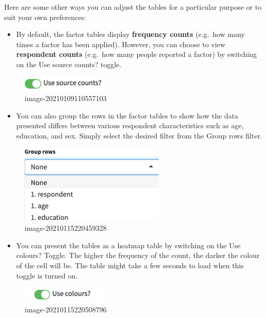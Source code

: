 \documentclass[
]{book}
\providecommand{\tightlist}{%
  \setlength{\itemsep}{0pt}\setlength{\parskip}{0pt}}
\begin{document}
Here are some other ways you can adjust the tables for a particular purpose or to suit your own preferences:

\begin{itemize}
\tightlist
\item
  By default, the factor tables display \textbf{frequency counts} (e.g.~how many times a factor has been applied). However, you can choose to view \textbf{respondent counts} (e.g.~how many people reported a factor) by switching on the Use source counts? toggle.
\end{itemize}

\begin{figure}
\centering
\includegraphics{_assets/image-20210109110557103.png}
\caption{image-20210109110557103}
\end{figure}

\begin{itemize}
\tightlist
\item
  You can also group the rows in the factor tables to show how the data presented differs between various respondent characteristics such as age, education, and sex. Simply select the desired filter from the Group rows filter.
\end{itemize}

\begin{figure}
\centering
\includegraphics{_assets/image-20210115220459328.png}
\caption{image-20210115220459328}
\end{figure}

\begin{itemize}
\tightlist
\item
  You can present the tables as a heatmap table by switching on the Use colours? Toggle. The higher the frequency of the count, the darker the colour of the cell will be. The table might take a few seconds to load when this toggle is turned on.
\end{itemize}

\begin{figure}
\centering
\includegraphics{_assets/image-20210115220508796.png}
\caption{image-20210115220508796}
\end{figure}
\end{document}
